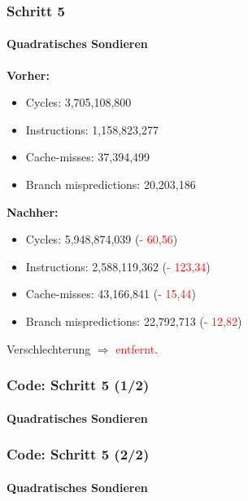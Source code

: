 \documentclass{beamer}
\newcommand{\fail}[1]{\textcolor{red}{#1}}
\begin{document}
  \begin{frame}
  	\frametitle{Schritt 5}
  	\framesubtitle{Quadratisches Sondieren}
  	\textbf{Vorher:}
		\begin{itemize}
			\item Cycles: 3,705,108,800 \\
			\item Instructions: 1,158,823,277\\
			\item Cache-misses: 37,394,499\\
			\item Branch mispredictions: 20,203,186\\
		\end{itemize}	
				
		\textbf{Nachher:}
		\begin{itemize}
			\item Cycles: 5,948,874,039 (\fail{- 60,56})\\
			\item Instructions: 2,588,119,362 (\fail{- 123,34})\\
			\item Cache-misses: 43,166,841 (\fail{- 15,44})\\
			\item Branch mispredictions: 22,792,713 (\fail{- 12,82})\\
		\end{itemize}	
		Verschlechterung $\Rightarrow$ \fail{entfernt}.
  \end{frame}
  
  \begin{frame}
  	\frametitle{Code: Schritt 5 (1/2)}
  	\framesubtitle{Quadratisches Sondieren}
		\sQuadratOne
  \end{frame}
  
  \begin{frame}
  	\frametitle{Code: Schritt 5 (2/2)}
  	\framesubtitle{Quadratisches Sondieren}
		\sQuadratTwo
  \end{frame}
      
\end{document}
